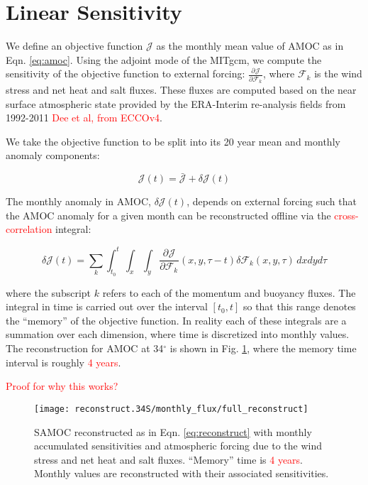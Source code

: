 \documentclass[a4paper,11pt]{article}
\newcommand{\pderiv}[3][]{%
  \ensuremath{\frac{\partial^{#1} {#2}}{\partial {#3}^{#1}}}}
\newcommand{\red}[1]{\textcolor{red}{#1}}
\begin{document}
  \section{Linear Sensitivity}
  \label{linearSensitivity}
  
  We define an objective function $\mathcal{J}$ as the monthly mean value of AMOC as in Eqn. \ref{eq:amoc}. Using the adjoint mode of the MITgcm, we compute the sensitivity of the objective function to external forcing: $\pderiv{\mathcal{J}}{\mathcal{F}_k}$, where $\mathcal{F}_k$ is the wind stress and net heat and salt fluxes. These fluxes are computed based on the near surface atmospheric state provided by the ERA-Interim re-analysis fields from 1992-2011 \red{Dee et al, from ECCOv4}. 
	
  We take the objective function to be split into its 20 year mean and monthly anomaly components: 

	\begin{equation}
	  \mathcal{J}(t) = \bar{\mathcal{J}} + \delta\mathcal{J}(t) 
	\end{equation}

  The monthly anomaly in AMOC, $\delta\mathcal{J}(t)$, depends on external forcing such that the AMOC anomaly for a given month can be reconstructed offline via the \red{cross-correlation} integral:
 
	\begin{equation}
	  \delta\mathcal{J}(t) = \sum_k\int_{t_0}^{t}\int_x \int_y\pderiv{\mathcal{J}}{\mathcal{F}_k}(x,y,\tau-t)\delta\mathcal{F}_k(x,y,\tau)\, dxdyd\tau  
	  \label{eq:reconstruct}
	\end{equation}

  where the subscript $k$ refers to each of the momentum and buoyancy fluxes. The integral in time is carried out over the interval $[t_0, t]$ so that this range denotes the ``memory'' of the objective function. In reality each of these integrals are a summation over each dimension, where time is discretized into monthly values. The reconstruction for AMOC at 34$^{\circ}$ is shown in Fig. \ref{fig:fullReconstruction}, where the memory time interval is roughly \red{4 years}.
 
  \red{Proof for why this works?}  

   \begin{figure}
    \centering
    \texttt{[image: reconstruct.34S/monthly\_flux/full\_reconstruct]}
    \caption{SAMOC reconstructed as in Eqn. \ref{eq:reconstruct} with monthly accumulated sensitivities and atmospheric forcing due to the wind stress and net heat and salt fluxes. ``Memory'' time is \red{4 years}. Monthly values are reconstructed with their associated sensitivities.}
    \label{fig:fullReconstruction}
   \end{figure}
\end{document}
